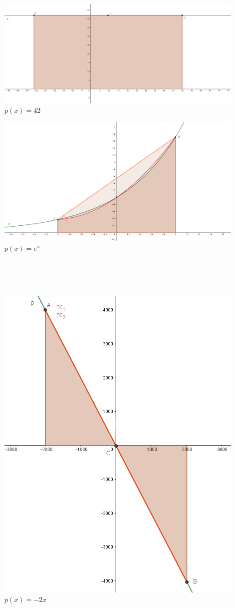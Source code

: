 \documentclass[course=erap]{aspdoc}
\begin{document}
\begin{minipage}[t]{0.5\textwidth}
\includegraphics[width=0.9\textwidth]{42_-31_50}
$p(x) = 42$
\end{minipage}
\begin{minipage}[t]{0.5\textwidth}
\includegraphics[width=0.9\textwidth]{e^x_-1_1}
$p(x) = e^x$
\end{minipage}\\
\\
\\\begin{minipage}[t]{0.5\textwidth}
\includegraphics[width=0.9\textwidth]{min2x_-2000_-_2019}\\
$p(x) = -2x$\\
\end{minipage}
\end{document}
